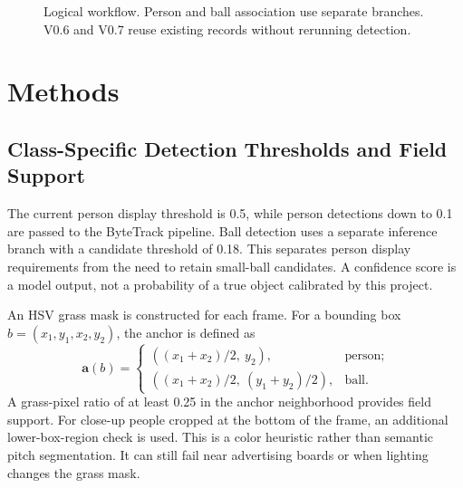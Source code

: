 \documentclass[11pt,a4paper]{article}
\begin{document}
\begin{figure}[htbp]
\centering
{}
\caption{Logical workflow. Person and ball association use separate branches.
V0.6 and V0.7 reuse existing records without rerunning detection.}
\end{figure}

\section{Methods}

\subsection{Class-Specific Detection Thresholds and Field Support}

The current person display threshold is 0.5, while person detections down to
0.1 are passed to the ByteTrack pipeline. Ball detection uses a separate
inference branch with a candidate threshold of 0.18. This separates person
display requirements from the need to retain small-ball candidates.
A confidence score is a model output, not a probability of a true object
calibrated by this project.

An HSV grass mask is constructed for each frame. For a bounding box
$b=(x_1,y_1,x_2,y_2)$, the anchor is defined as
\begin{equation}
 \mathbf{a}(b)=
 \begin{cases}
 ((x_1+x_2)/2,\ y_2), & \text{person};\\
 ((x_1+x_2)/2,\ (y_1+y_2)/2), & \text{ball}.
 \end{cases}
\end{equation}
A grass-pixel ratio of at least 0.25 in the anchor neighborhood provides
field support. For close-up people cropped at the bottom of the frame, an
additional lower-box-region check is used. This is a color heuristic rather
than semantic pitch segmentation. It can still fail near advertising boards
or when lighting changes the grass mask.
\end{document}
